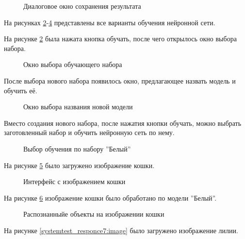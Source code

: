 \begin{figure}[H]
\caption{Диалоговое окно сохранения результата}
\label{systemtest_responce4:image}
\end{figure}

На рисунках \ref{systemtest_train1:image}-\ref{systemtest_train3:image} представлены все варианты обучения нейронной сети.

На рисунке \ref{systemtest_train1:image} была нажата кнопка обучать, после чего открылось окно выбора набора.

\begin{figure}[H]
\caption{Окно выбора обучающего набора}
\label{systemtest_train1:image}
\end{figure}

После выбора нового набора появилось окно, предлагающее назвать модель и обучить её.

\begin{figure}[H]
\caption{Окно выбора названия новой модели}
\label{systemtest_train2:image}
\end{figure}

Вместо создания нового набора, после нажатия кнопки обучать, можно выбрать заготовленный набор и обучить нейронную сеть по нему.

\begin{figure}[H]
\caption{Выбор обучения по набору ''Белый''}
\label{systemtest_train3:image}
\end{figure}

На рисунке \ref{systemtest_responce5:image} было загружено изображение кошки.

\begin{figure}[H]
\caption{Интерфейс с изображением кошки}
\label{systemtest_responce5:image}
\end{figure}

На рисунке \ref{systemtest_responce6:image} изображение кошки было обработано по модели ''Белый''.

\begin{figure}[H]
\caption{Распознанныйе объекты на изображении кошки}
\label{systemtest_responce6:image}
\end{figure}
На рисунке \ref{systemtest_responce7:image} было загружено изображение лилии.

